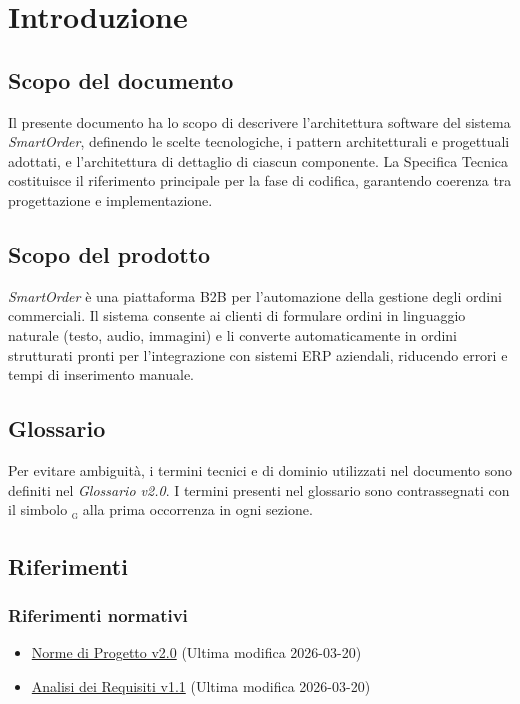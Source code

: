 \documentclass[a4paper, 11pt, oneside]{scrartcl}
\begin{document}
\newpage
\section{Introduzione}

\subsection{Scopo del documento}
Il presente documento ha lo scopo di descrivere l'architettura software del sistema \textit{SmartOrder}, definendo le scelte tecnologiche, i pattern architetturali e progettuali adottati, e l'architettura di dettaglio di ciascun componente.
La Specifica Tecnica costituisce il riferimento principale per la fase di codifica, garantendo coerenza tra progettazione e implementazione.

\subsection{Scopo del prodotto}
\textit{SmartOrder} \`e una piattaforma B2B per l'automazione della gestione degli ordini commerciali. Il sistema consente ai clienti di formulare ordini in linguaggio naturale (testo, audio, immagini) e li converte automaticamente in ordini strutturati pronti per l'integrazione con sistemi ERP aziendali, riducendo errori e tempi di inserimento manuale.

\subsection{Glossario}
Per evitare ambiguit\`a, i termini tecnici e di dominio utilizzati nel documento sono definiti nel \textit{Glossario v2.0}.
I termini presenti nel glossario sono contrassegnati con il simbolo \textsubscript{\textsc{g}} alla prima occorrenza in ogni sezione.

\subsection{Riferimenti}

\subsubsection{Riferimenti normativi}
\begin{itemize}
    \item \href{https://swenightpro.github.io/Documentazione/docs/RTB/Documentazione%20Interna/Norme_di_Progetto_v2.0.pdf}{Norme di Progetto v2.0} (Ultima modifica 2026-03-20)
    \item \href{https://swenightpro.github.io/Documentazione/docs/RTB/Documentazione%20Esterna/Analisi_dei_Requisiti_v1.1.pdf}{Analisi dei Requisiti v1.1} (Ultima modifica 2026-03-20)
\end{itemize}
\end{document}
